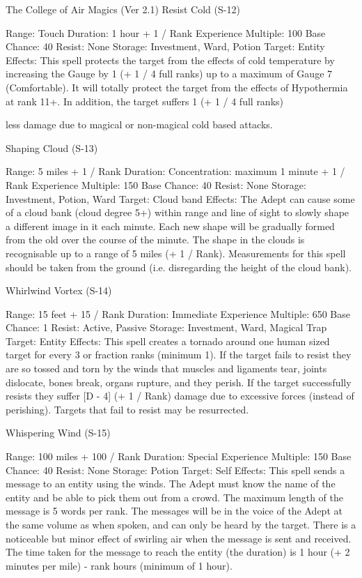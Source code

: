\begin{Chapter}{The College of Air Magics (Ver 2.1)}
Resist Cold (S-12) 

Range: Touch 
Duration: 1 hour + 1 / Rank 
Experience Multiple: 100 
Base Chance: 40%
Resist: None 
Storage: Investment, Ward, Potion 
Target: Entity 
Effects:  This  spell  protects  the  target  from  the 
effects  of  cold  temperature  by  increasing  the 
Gauge by 1 (+ 1 / 4 full ranks) up to a maximum of 
Gauge  7  (Comfortable).  It  will  totally  protect  the 
target from the effects of Hypothermia at rank 11+. 
In addition, the target suffers 1 (+ 1 / 4 full ranks) 

less  damage  due  to  magical  or  non-magical  cold 
based attacks. 

Shaping Cloud (S-13) 

Range: 5 miles + 1 / Rank 
Duration: Concentration: maximum 1 minute + 1 / 
Rank 
Experience Multiple: 150 
Base Chance: 40%
Resist: None 
Storage: Investment, Potion, Ward 
Target: Cloud band 
Effects: The Adept can cause some of a cloud bank 
(cloud degree 5+) within range and line of sight to 
slowly  shape  a  different  image  in  it  each  minute. 
Each new shape will be gradually formed from the 
old over the course of the minute. The shape in the 
clouds is recognisable up to a range of 5 miles (+ 1 
/  Rank).  Measurements  for  this  spell  should  be 
taken from the ground (i.e. disregarding the height 
of the cloud bank). 

Whirlwind Vortex (S-14) 

Range: 15 feet + 15 / Rank 
Duration: Immediate 
Experience Multiple: 650 
Base Chance: 1%
Resist: Active, Passive 
Storage: Investment, Ward, Magical Trap 
Target: Entity 
Effects:  This  spell  creates  a  tornado  around  one 
human  sized  target  for  every  3  or  fraction  ranks 
(minimum 1). If the target fails to resist they are so 
tossed  and  torn  by  the  winds  that  muscles  and 
ligaments tear, joints dislocate, bones break, organs 
rupture,  and  they  perish.  If  the  target  successfully 
resists they suffer [D - 4] (+ 1 / Rank) damage due 
to  excessive  forces  (instead  of  perishing).  Targets 
that fail to resist may be resurrected. 

Whispering Wind (S-15) 

Range: 100 miles + 100 / Rank 
Duration: Special 
Experience Multiple: 150 
Base Chance: 40%
Resist: None 
Storage: Potion 
Target: Self 
Effects:  This  spell  sends  a  message  to  an  entity 
using the winds. The Adept must know the name of 
the  entity  and  be  able  to  pick  them  out  from  a 
crowd.  The  maximum  length  of  the  message  is  5 
words per rank. The messages will be in the voice 
of  the  Adept  at the  same  volume  as  when  spoken, 
and  can  only  be  heard  by  the  target.  There  is  a 
noticeable but minor effect of swirling air when the 
message  is  sent  and  received.  The  time  taken  for 
the  message  to  reach  the  entity  (the  duration)  is  1 
hour (+ 2 minutes per mile) - rank hours (minimum 
of 1 hour). 


\end{Chapter}
